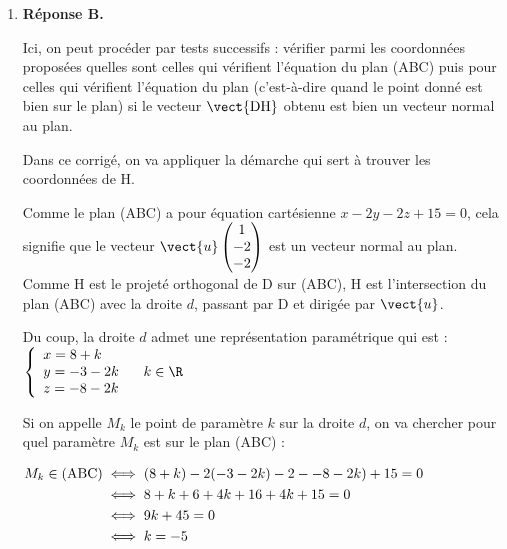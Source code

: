 \begin{enumerate}
Pour la proposition \textbf{d.}, aucunes des coordonnées des points B, C et D ne vérifient pas l'équation.

Par contre, pour l'équation de la proposition \textbf{c.}, on a :

$4 x_\mathrm{B}+y_\mathrm{B}+z_\mathrm{B}-21=4\times 3 + 6 + 3 - 21 = 12 + 9 - 21 =0$ donc B appartient à ce plan.

$4 x_\mathrm{C}+y_\mathrm{C}+z_\mathrm{C}-21=4\times 3 + 0 + 9 - 21 = 12 + 9 -21 =0$ donc C appartient à ce plan.

$4 x_\mathrm{D}+y_\mathrm{D}+z_\mathrm{D}-21=4\times 8 - 3 - 8 - 21 = 32 - 11 - 21 = 0$ donc D appartient à ce plan.

Ainsi, l'équation de la proposition \textbf{c.} décrit un plan qui contient les points B, C et D : c'est le plan (BCD).

	\item \textbf{Réponse B.}

Ici, on peut procéder par tests successifs : vérifier parmi les coordonnées proposées quelles sont celles qui vérifient l'équation du plan (ABC) puis pour celles qui vérifient l'équation du plan (c'est-à-dire quand le point donné est bien sur le plan) si le vecteur $\vect{\mathrm{DH}}$ obtenu est bien un vecteur normal au plan.

Dans ce corrigé, on va appliquer la démarche qui sert à trouver les coordonnées de H.

Comme le plan (ABC) a pour équation cartésienne $x-2 y-2 z+15=0$, cela signifie que le vecteur $\vect{u} \begin{pmatrix}1\\-2\\-2\end{pmatrix}$ est un vecteur normal au plan. Comme H est le projeté orthogonal de D sur (ABC), H est l'intersection du plan (ABC) avec la droite $d$, passant par D et dirigée par $\vect{u}$.

Du coup, la droite $d$ admet une représentation paramétrique qui est : $\left\{\begin{array}{l} x=8+k\\y=-3-2k\\z=-8-2k \end{array}\right. \quad k \in \R$

Si on appelle $M_k$ le point de paramètre $k$ sur la droite $d$, on va chercher pour quel paramètre $M_k$ est sur le plan (ABC) :

$\aligned M_k \in (\mathrm{ABC}) &\iff (8+k) -2(-3-2k) - 2--8-2k)+15=0\\
&\iff 8+k+6+4k+16+4k+15 = 0\\
&\iff 9k + 45 = 0\\
&\iff k = -5\\ \endaligned$


\end{enumerate}
